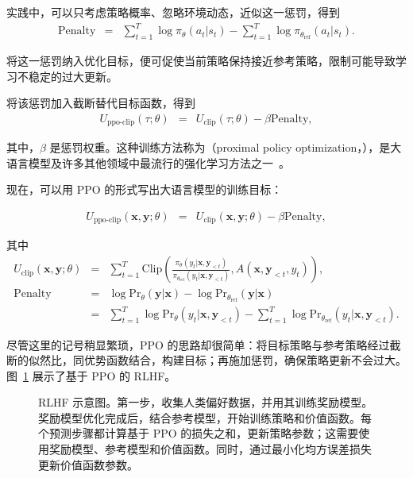 \noindent 实践中，可以只考虑策略概率、忽略环境动态，近似这一惩罚，得到
\begin{eqnarray}
\mathrm{Penalty} & = & \sum_{t=1}^{T} \log \pi_{\theta}(a_t|s_t) - \sum_{t=1}^{T} \log \pi_{\theta_{\mathrm{ref}}}(a_t|s_t).
\end{eqnarray}

\noindent 将这一惩罚纳入优化目标，便可促使当前策略保持接近参考策略，限制可能导致学习不稳定的过大更新。

将该惩罚加入截断替代目标函数，得到
\begin{eqnarray}
U_{\mathrm{ppo\text{-}clip}}(\tau;\theta) & = & U_{\mathrm{clip}}(\tau;\theta) - \beta \mathrm{Penalty},
\end{eqnarray}

\noindent 其中，$\beta$ 是惩罚权重。这种训练方法称为（proximal policy optimization，），是大语言模型及许多其他领域中最流行的强化学习方法之一~\cite{schulman-etal:2017proximal}。

现在，可以用 PPO 的形式写出大语言模型的训练目标：

\begin{eqnarray}
U_{\mathrm{ppo\text{-}clip}}(\mathbf{x},\mathbf{y};\theta) & = & U_{\mathrm{clip}}(\mathbf{x},\mathbf{y};\theta) - \beta \mathrm{Penalty} \label{eq:ppo-objective-llm},
\end{eqnarray}

\noindent 其中
\begin{eqnarray}
U_{\mathrm{clip}}(\mathbf{x},\mathbf{y};\theta) & = & \sum_{t=1}^{T} \mathrm{Clip}\left( \frac{\pi_{\theta}(y_t|\mathbf{x},\mathbf{y}_{<t})}{\pi_{\theta_{\mathrm{ref}}}(y_t|\mathbf{x},\mathbf{y}_{<t})}, A(\mathbf{x},\mathbf{y}_{<t},y_t)  \right), \\
\mathrm{Penalty} & = & \log \mathrm{Pr}_{\theta}(\mathbf{y}|\mathbf{x}) - \log \mathrm{Pr}_{\theta_{\mathrm{ref}}}(\mathbf{y}|\mathbf{x}) \nonumber \\
                 & = & \sum_{t=1}^{T} \log \mathrm{Pr}_{\theta}(y_t|\mathbf{x},\mathbf{y}_{<t}) - \sum_{t=1}^{T} \log \mathrm{Pr}_{\theta_{\mathrm{ref}}}(y_t|\mathbf{x},\mathbf{y}_{<t}).
\end{eqnarray}

尽管这里的记号稍显繁琐，PPO 的思路却很简单：将目标策略与参考策略经过截断的似然比，同优势函数结合，构建目标；再施加惩罚，确保策略更新不会过大。图~\ref{fig:ppo-rlhf} 展示了基于 PPO 的 RLHF。

\begin{figure}[!t]
\centering

\caption{RLHF 示意图。第一步，收集人类偏好数据，并用其训练奖励模型。奖励模型优化完成后，结合参考模型，开始训练策略和价值函数。每个预测步骤都计算基于 PPO 的损失之和，更新策略参数；这需要使用奖励模型、参考模型和价值函数。同时，通过最小化均方误差损失更新价值函数参数。}
\label{fig:ppo-rlhf}
\end{figure}

